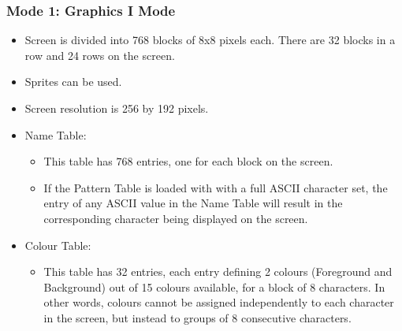         \subsubsection{Mode 1: \textbf{Graphics I Mode}}
        \begin{itemize}
            \item Screen is divided into 768 blocks of 8x8 pixels each. There
                are 32 blocks in a row and 24 rows on the screen.
            \item Sprites can be used.
            \item Screen resolution is 256 by 192 pixels.
            \item Name Table:
            \begin{itemize}
                \item This table has 768 entries, one for each block on the screen.
                \item If the Pattern Table is loaded with with a full ASCII
                    character set, the entry of any ASCII value in the Name
                    Table will result in the corresponding character being
                    displayed on the screen.
            \end{itemize}
            \item Colour Table:
            \begin{itemize}
                \item This table has 32 entries, each entry defining 2 colours
                (Foreground and Background) out of 15 colours available, for a
                block of 8 characters. In other words, colours cannot be
                assigned independently to each character in the screen, but
                instead to groups of 8 consecutive characters.
            \end{itemize}
        \end{itemize}

